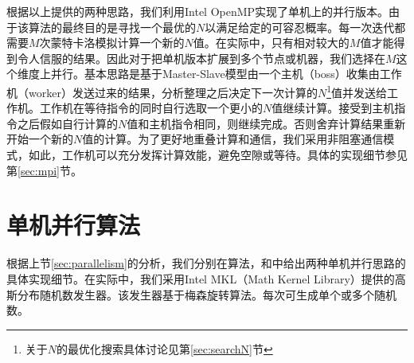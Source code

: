 根据以上提供的两种思路，我们利用Intel OpenMP实现了单机上的并行版本。由于该算法的最终目的是寻找一个最优的$N$以满足给定的可容忍概率。每一次迭代都需要$M$次蒙特卡洛模拟计算一个新的$N$值。在实际中，只有相对较大的$M$值才能得到令人信服的结果。因此对于把单机版本扩展到多个节点或机器，我们选择在$M$这个维度上并行。基本思路是基于Master-Slave模型由一个主机（boss）收集由工作机（worker）发送过来的结果，分析整理之后决定下一次计算的$N$\footnote{关于$N$的最优化搜索具体讨论见第\ref{sec:searchN}节}值并发送给工作机。工作机在等待指令的同时自行选取一个更小的$N$值继续计算。接受到主机指令之后假如自行计算的$N$值和主机指令相同，则继续完成。否则舍弃计算结果重新开始一个新的$N$值的计算。为了更好地重叠计算和通信，我们采用非阻塞通信模式，如此，工作机可以充分发挥计算效能，避免空隙或等待。具体的实现细节参见第\ref{sec:mpi}节。

\section{单机并行算法}
\label{sec:monoparallel}
根据上节\ref{sec:parallelism}的分析，我们分别在算法\label{alg:omp1}，\label{alg:omp2_1}和\label{alg:omp2_2}中给出两种单机并行思路的具体实现细节。在实际中，我们采用Intel MKL（Math Kernel Library）提供的高斯分布随机数发生器。该发生器基于梅森旋转算法。每次可生成单个或多个随机数。

